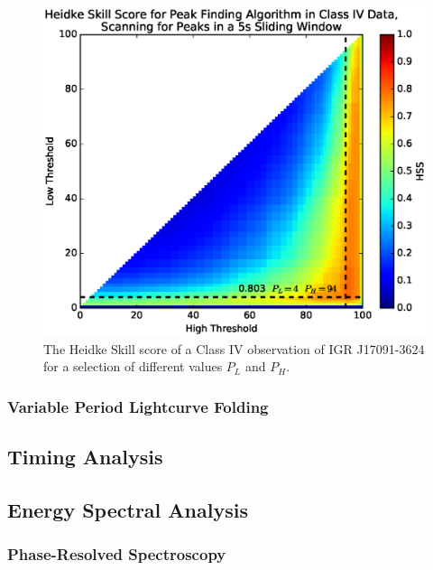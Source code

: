 \begin{figure}
    \includegraphics[width=\columnwidth, trim = 0mm 10mm 0mm 10mm]{images/HSS_J.eps}
    \captionsetup{singlelinecheck=off}
    \caption{The Heidke Skill score of a Class IV observation of IGR J17091-3624 for a selection of different values $P_L$ and $P_H$.}
   \label{fig:Heidke}
\end{figure}

\subsubsection{Variable Period Lightcurve Folding}

\subsection{Timing Analysis}

\subsection{Energy Spectral Analysis}

\subsubsection{Phase-Resolved Spectroscopy}
\label{sec:phasresspec}

